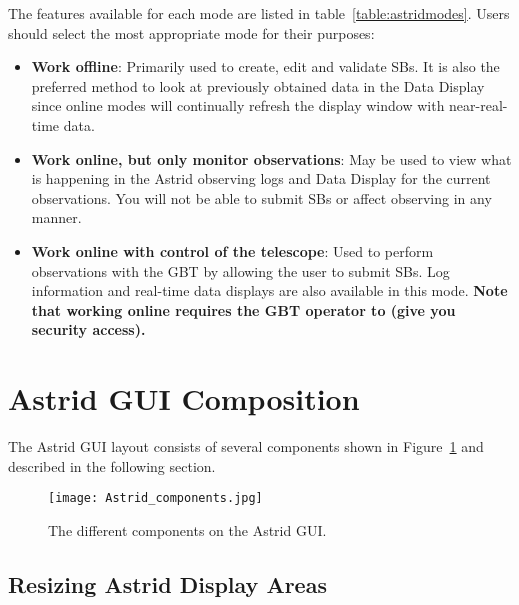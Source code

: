 \noindent The features available for each mode are listed in
table~\ref{table:astridmodes}.  Users should select the most appropriate
mode for their purposes:

\begin{itemize}[leftmargin=*]
\item {\bf Work offline}: Primarily used to create, edit and validate \glspl{SB}.
It is also the preferred method to look at previously obtained data in the Data
Display since online modes will continually refresh the display window with
near-real-time data.

\item {\bf Work online, but only monitor observations}: May be used to view what
is happening in the \gls{Astrid} observing logs and Data Display for the current
observations. You will not be able to submit \glspl{SB} or affect observing in any
manner.

\item {\bf Work online with control of the telescope}: Used to perform observations
with the \gls{GBT} by allowing the user to submit \glspl{SB}. Log information and
real-time data displays are also available in this mode.
{\bf Note that working online requires the \gls{GBT} operator to  (give you security access).}
\end{itemize}

\newpage

\section{Astrid GUI Composition}\label{sec:astridcomposition}

The \gls{Astrid} \gls{GUI} layout consists of several components shown in
Figure~\ref{fig:astridcomposition} and described in the following section.

\begin{figure}[!h]
\begin{center}
\texttt{[image: Astrid\_components.jpg]}
\caption[Components of the Astrid GUI]
{The different components on the \gls{Astrid} \gls{GUI}.
\label{fig:astridcomposition} }
\end{center}
\end{figure}

\subsection{Resizing Astrid Display Areas}

